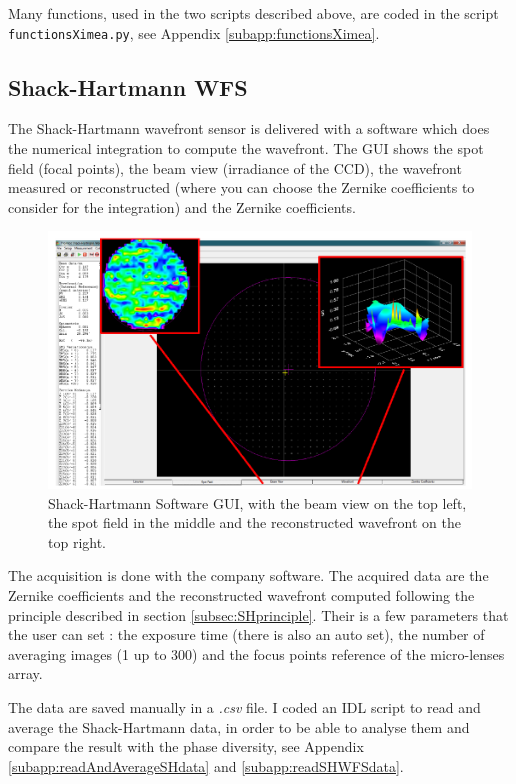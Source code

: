 Many functions, used in the two scripts described above, are coded in the script \verb!functionsXimea.py!, see Appendix \ref{subapp:functionsXimea}.

\subsection{Shack-Hartmann WFS}
\label{subsec:acquisSHwfs}

The Shack-Hartmann wavefront sensor is delivered with a software which does the numerical integration to compute
the wavefront. The GUI shows the spot field (focal points), the beam view (irradiance of the
CCD), the wavefront measured or reconstructed (where you can choose the Zernike coefficients
to consider for the integration) and the Zernike coefficients.

\begin{figure}
\begin{center}
\includegraphics[width=\textwidth,angle=0]{Figures/SHWFS_GUI}
\decoRule
\caption{Shack-Hartmann Software GUI, with the  beam view on the top left, the spot field in the middle and the reconstructed wavefront on the top right.}
\label{fig:}
\end{center}
\end{figure}

The acquisition is done with the company software. The acquired data are the Zernike coefficients and the reconstructed wavefront computed following the principle described in section \ref{subsec:SHprinciple}. Their is a few parameters that the user can set : the exposure time (there is also an auto set), the number of averaging images (1 up to 300) and the focus points reference of the micro-lenses array. 

The data are saved manually in a \textit{.csv} file. I coded an IDL script to read and average the Shack-Hartmann data, in order to be able to analyse them and compare the result with the phase diversity, see Appendix \ref{subapp:readAndAverageSHdata} and \ref{subapp:readSHWFSdata}. 

